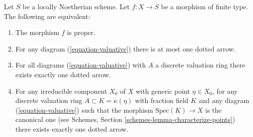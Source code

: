 \begin{lemma}
\label{lemma-Noetherian-dvr-valuative-proper}
Let $S$ be a locally Noetherian scheme.
Let $f : X \to S$ be a morphism of finite type.
The following are equivalent:
\begin{enumerate}
\item The morphism $f$ is proper.
\item For any diagram (\ref{equation-valuative}) there is at most
one dotted arrow.
\item For all diagrams (\ref{equation-valuative}) with $A$ a discrete
valuation ring there exists exactly one dotted arrow.
\item For any irreducible component $X_0$ of $X$ with
generic point $\eta \in X_0$, for any discrete valuation ring
$A \subset K = \kappa(\eta)$ with fraction field $K$ and any
diagram (\ref{equation-valuative}) such that
the morphism $\text{Spec}(K) \to X$ is the canonical one
(see Schemes, Section \ref{schemes-lemma-characterize-points})
there exists exactly one dotted arrow.
\end{enumerate}
\end{lemma}

